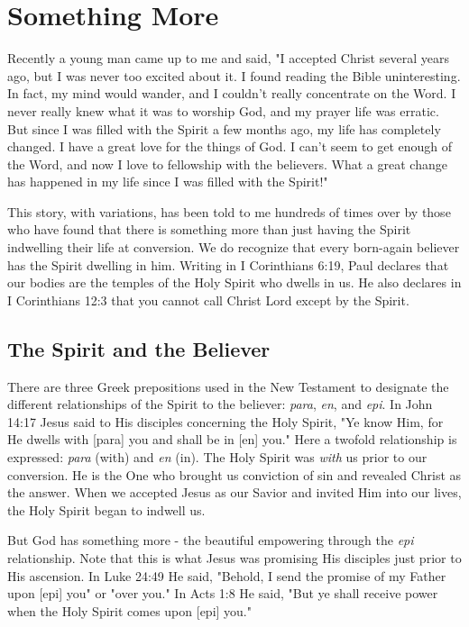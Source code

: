 \chapter{Something More}

Recently a young man came up to me and said, "I accepted Christ several years ago, but I was never too excited about it. I found reading the Bible uninteresting. In fact, my mind would wander, and I couldn't really concentrate on the Word. I never really knew what it was to worship God, and my prayer life was erratic. But since I was filled with the Spirit a few months ago, my life has completely changed. I have a great love for the things of God. I can't seem to get enough of the Word, and now I love to fellowship with the believers. What a great change has happened in my life since I was filled with the Spirit!" 

This story, with variations, has been told to me hundreds of times over by those who have found that there is something more than just having the Spirit indwelling their life at conversion. We do recognize that every born-again believer has the Spirit dwelling in him. Writing in I Corinthians 6:19, Paul declares that our bodies are the temples of the Holy Spirit who dwells in us. He also declares in I Corinthians 12:3 that you cannot call Christ Lord except by the Spirit. 

\section*{The Spirit and the Believer}

There are three Greek prepositions used in the New Testament to designate the different relationships of the Spirit to the believer: \emph{para}, \emph{en}, and \emph{epi}. In John 14:17 Jesus said to His disciples concerning the Holy Spirit, "Ye know Him, for He dwells with [para] you and shall be in [en] you." Here a twofold relationship is expressed: \emph{para} (with) and \emph{en} (in). The Holy Spirit was \emph{with} us prior to our conversion. He is the One who brought us conviction of sin and revealed Christ as the answer. When we accepted Jesus as our Savior and invited Him into our lives, the Holy Spirit began to indwell us. 

But God has something more - the beautiful empowering through the \emph{epi} relationship. Note that this is what Jesus was promising His disciples just prior to His ascension. In Luke 24:49 He said, "Behold, I send the promise of my Father upon [epi] you" or "over you." In Acts 1:8 He said, "But ye shall receive power when the Holy Spirit comes upon [epi] you." 

